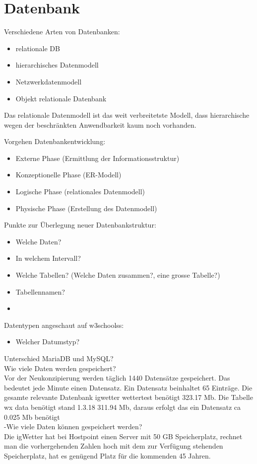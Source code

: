 \section{Datenbank}

Verschiedene Arten von Datenbanken:
\begin{itemize}
\item relationale DB
\item hierarchisches Datenmodell
\item Netzwerkdatenmodell
\item Objekt relationale Datenbank
\end{itemize}

Das relationale Datenmodell ist das weit verbreitetste Modell, dass hierarchische wegen der beschränkten Anwendbarkeit kaum noch vorhanden.

Vorgehen Datenbankentwicklung:

\begin{itemize}
\item Externe Phase (Ermittlung der Informationsstruktur)
\item Konzeptionelle Phase (ER-Modell)
\item Logische Phase (relationales Datenmodell)
\item Physische Phase (Erstellung des Datenmodell)
\end{itemize}

Punkte zur Überlegung neuer Datenbankstruktur:
\begin{itemize}
\item Welche Daten?
\item In welchem Intervall?
\item Welche Tabellen? (Welche Daten zusammen?, eine grosse Tabelle?)
\item Tabellennamen?
\item 
\end{itemize}

Datentypen angeschaut auf w3schoolss:
\begin{itemize}
\item Welcher Datumstyp?

\end{itemize}


Unterschied MariaDB und MySQL?\\
Wie viele Daten werden gespeichert?\\
Vor der Neukonzipierung werden täglich 1440 Datensätze gespeichert. Das bedeutet jede Minute einen Datensatz. Ein Datensatz beinhaltet 65 Einträge. Die gesamte relevante Datenbank igwetter wettertest benötigt 323.17  Mb. Die Tabelle wx data benötigt stand 1.3.18 311.94 Mb, daraus erfolgt das ein Datensatz ca 0.025 Mb benötigt \\
-Wie viele Daten können gespeichert werden?\\
Die igWetter hat bei Hostpoint einen Server mit 50 GB Speicherplatz, rechnet man die vorhergehenden Zahlen hoch mit dem zur Verfügung stehenden Speicherplatz, hat es genügend Platz für die kommenden 45 Jahren.\\

